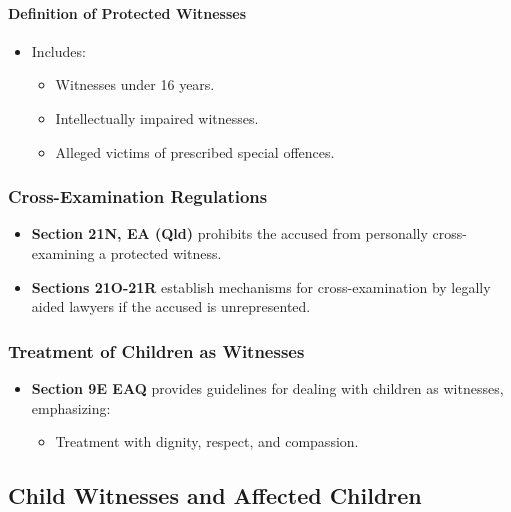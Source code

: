 \paragraph{Definition of Protected
Witnesses}\label{definition-of-protected-witnesses}

\begin{itemize}
\tightlist
\item
  Includes:

  \begin{itemize}
  \tightlist
  \item
    Witnesses under 16 years.
  \item
    Intellectually impaired witnesses.
  \item
    Alleged victims of prescribed special offences.
  \end{itemize}
\end{itemize}

\subsubsection{Cross-Examination
Regulations}\label{cross-examination-regulations}

\begin{itemize}
\tightlist
\item
  \textbf{Section 21N, EA (Qld)} prohibits the accused from personally
  cross-examining a protected witness.
\item
  \textbf{Sections 21O-21R} establish mechanisms for cross-examination
  by legally aided lawyers if the accused is unrepresented.
\end{itemize}

\subsubsection{Treatment of Children as
Witnesses}\label{treatment-of-children-as-witnesses}

\begin{itemize}
\tightlist
\item
  \textbf{Section 9E EAQ} provides guidelines for dealing with children
  as witnesses, emphasizing:

  \begin{itemize}
  \tightlist
  \item
    Treatment with dignity, respect, and compassion.
  \end{itemize}
\end{itemize}

\subsection{  Child Witnesses and Affected
Children}\label{child-witnesses-and-affected-children}

